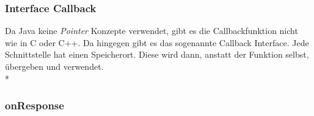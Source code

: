 \subsubsection{Interface Callback}
\cite{Callback}
Da Java keine \textit{Pointer} Konzepte verwendet, gibt es die Callbackfunktion nicht wie in C oder C++.
Da hingegen gibt es das sogenannte Callback Interface.
Jede Schnittstelle hat einen Speicherort. Diese wird dann, anstatt der Funktion selbst, übergeben und verwendet.
\\*

\subsubsection{onResponse}






